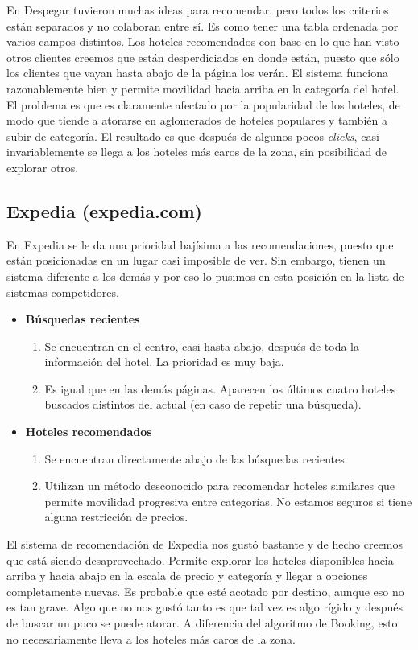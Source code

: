 \documentclass[12pt]{report}
\begin{document}
En Despegar tuvieron muchas ideas para recomendar, pero todos los criterios están separados y no colaboran entre sí. Es como tener una tabla ordenada por varios campos distintos. Los hoteles recomendados con base en lo que han visto otros clientes creemos que están desperdiciados en donde están, puesto que sólo los clientes que vayan hasta abajo de la página los verán. El sistema funciona razonablemente bien y permite movilidad hacia arriba en la categoría del hotel. El problema es que es claramente afectado por la popularidad de los hoteles, de modo que tiende a atorarse en aglomerados de hoteles populares y también a subir de categoría. El resultado es que después de algunos pocos \emph{clicks}, casi invariablemente se llega a los hoteles más caros de la zona, sin posibilidad de explorar otros.

\subsection*{Expedia (expedia.com)}

En Expedia se le da una prioridad bajísima a las recomendaciones, puesto que están posicionadas en un lugar casi imposible de ver. Sin embargo, tienen un sistema diferente a los demás y por eso lo pusimos en esta posición en la lista de sistemas competidores.
\begin{itemize}
	\item \textbf{Búsquedas recientes}
	\begin{enumerate}
		\item Se encuentran en el centro, casi hasta abajo, después de toda la información del hotel. La prioridad es muy baja.
		\item Es igual que en las demás páginas. Aparecen los últimos cuatro hoteles buscados distintos del actual (en caso de repetir una búsqueda).
	\end{enumerate}
	\item \textbf{Hoteles recomendados}
	\begin{enumerate}
		\item Se encuentran directamente abajo de las búsquedas recientes.
		\item Utilizan un método desconocido para recomendar hoteles similares que permite movilidad progresiva entre categorías. No estamos seguros si tiene alguna restricción de precios.
	\end{enumerate}
\end{itemize}
El sistema de recomendación de Expedia nos gustó bastante y de hecho creemos que está siendo desaprovechado. Permite explorar los hoteles disponibles hacia arriba y hacia abajo en la escala de precio y categoría y llegar a opciones completamente nuevas. Es probable que esté acotado por destino, aunque eso no es tan grave. Algo que no nos gustó tanto es que tal vez es algo rígido y después de buscar un poco se puede atorar. A diferencia del algoritmo de Booking, esto no necesariamente lleva a los hoteles más caros de la zona.
\end{document}
